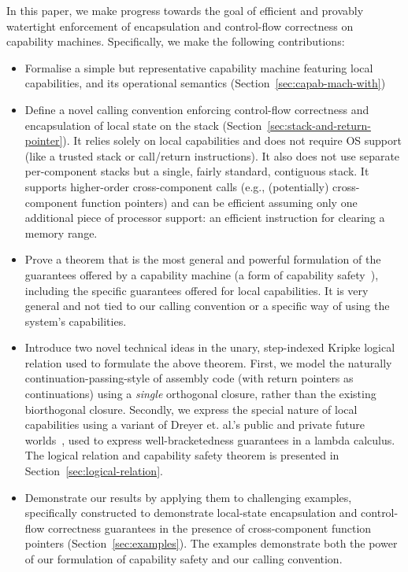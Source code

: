 \documentclass[compsoc,conference,letterpaper,fleqn]{IEEEtran}
\newcommand\lau[1]{{\color{purple} \sf \footnotesize {LS: #1}}\\}
\renewcommand\lau[1]{}
\begin{document}
In this paper, we make progress towards the goal of efficient and provably
watertight enforcement of encapsulation and control-flow correctness on
capability machines. Specifically, we make the following contributions:
\begin{itemize}
\item Formalise a simple but representative capability machine featuring local
  capabilities, and its operational semantics
  (Section~\ref{sec:capab-mach-with})
\item Define a novel calling convention enforcing control-flow correctness and
  encapsulation of local state on the stack
  (Section~\ref{sec:stack-and-return-pointer}). It relies solely on local
  capabilities and does not require OS support (like a trusted stack or
  call/return instructions). It also does not use separate per-component stacks
  but a single, fairly standard, contiguous stack. It supports higher-order
  cross-component calls (e.g., (potentially) cross-component function pointers)
  and can be efficient assuming only one additional piece of processor support:
  an efficient instruction for clearing a memory range.
\item Prove a theorem that is the most general and powerful formulation of the
  guarantees offered by a capability machine (a form of capability
  safety~\cite{Devriese:2016ObjCap,Maffeis2010OC}), including the specific
  guarantees offered for local capabilities. It is very general and not tied to
  our calling convention or a specific way of using the system's capabilities.
\item Introduce two novel technical ideas in the unary, step-indexed Kripke
  logical relation used to formulate the above theorem. First, we model the
  naturally continuation-passing-style of assembly code (with return pointers as
  continuations) using a \emph{single} orthogonal closure, rather than the
  existing biorthogonal closure. Secondly, we express the special nature of
  local capabilities using a variant of Dreyer et. al.'s public and private
  future worlds~\citep{Dreyer:jfp12}, used to express well-bracketedness
  guarantees in a lambda calculus. The logical relation and capability safety
  theorem is presented in Section~\ref{sec:logical-relation}.
\item Demonstrate our results by applying them to challenging examples,
  specifically constructed to demonstrate local-state encapsulation and
  control-flow correctness guarantees in the presence of cross-component
  function pointers (Section~\ref{sec:examples}). The examples demonstrate both
  the power of our formulation of capability safety and our calling convention.
\end{itemize}
\end{document}
